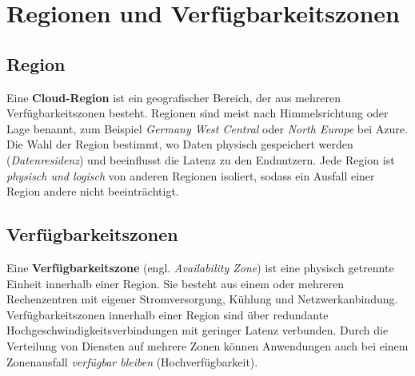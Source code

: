 \section{Regionen und Verfügbarkeitszonen}
\subsection{Region}
Eine \textbf{Cloud-Region} ist ein geografischer Bereich, der aus mehreren
Verfügbarkeitszonen besteht. Regionen sind meist nach Himmelsrichtung
oder Lage benannt, zum Beispiel \textit{Germany West Central} oder
\textit{North Europe} bei Azure. Die Wahl der Region bestimmt, wo Daten
physisch gespeichert werden (\emph{Datenresidenz}) und beeinflusst die Latenz
zu den Endnutzern. Jede Region ist \emph{physisch und logisch} von anderen
Regionen isoliert, sodass ein Ausfall einer Region andere nicht
beeinträchtigt.
\subsection{Verfügbarkeitszonen}
Eine \textbf{Verfügbarkeitszone} (engl. \textit{Availability Zone}) ist eine
physisch getrennte Einheit innerhalb einer Region. Sie besteht aus einem
oder mehreren Rechenzentren mit eigener Stromversorgung, Kühlung und
Netzwerkanbindung. Verfügbarkeitszonen innerhalb einer Region sind über
redundante Hochgeschwindigkeitsverbindungen mit geringer Latenz
verbunden. Durch die Verteilung von Diensten auf mehrere Zonen können
Anwendungen auch bei einem Zonenausfall \emph{verfügbar bleiben}
(Hochverfügbarkeit).
